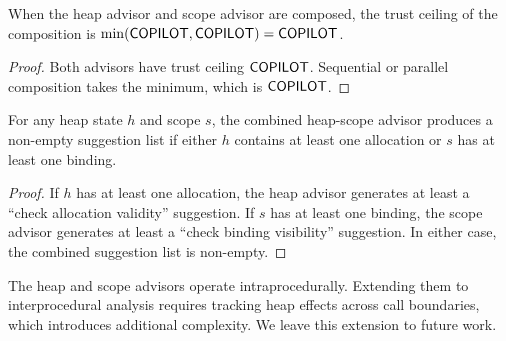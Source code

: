 \documentclass[11pt]{article}
\begin{document}
\begin{lemma}
\label{lem:combined-ceil}
When the heap advisor and scope advisor are composed, the trust
ceiling of the composition is $\min(\mathsf{COPILOT}, \mathsf{COPILOT}) = \mathsf{COPILOT}$.
\end{lemma}

\begin{proof}
Both advisors have trust ceiling $\mathsf{COPILOT}$.  Sequential or
parallel composition takes the minimum, which is $\mathsf{COPILOT}$.
\end{proof}

\begin{proposition}
\label{prop:hs-complete}
For any heap state $h$ and scope $s$, the combined heap-scope
advisor produces a non-empty suggestion list if either $h$ contains
at least one allocation or $s$ has at least one binding.
\end{proposition}

\begin{proof}
If $h$ has at least one allocation, the heap advisor generates
at least a ``check allocation validity'' suggestion.  If $s$ has
at least one binding, the scope advisor generates at least a
``check binding visibility'' suggestion.  In either case, the
combined suggestion list is non-empty.
\end{proof}

\begin{remark}
The heap and scope advisors operate intraprocedurally.
Extending them to interprocedural analysis requires tracking
heap effects across call boundaries, which introduces additional
complexity.  We leave this extension to future work.
\end{remark}
\end{document}
